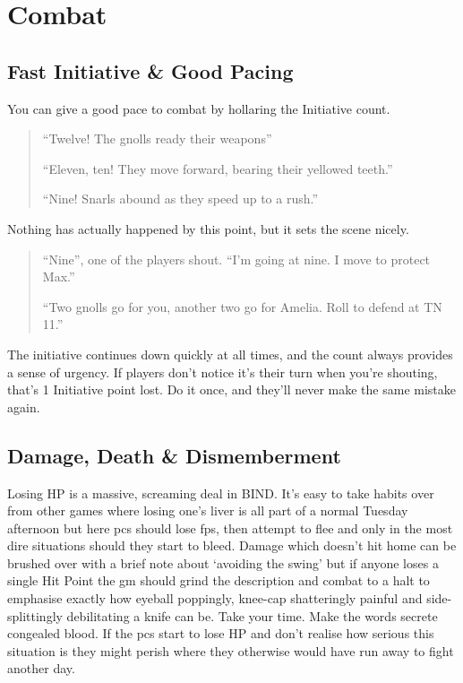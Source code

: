 \section{Combat}

\begin{multicols}{2}

\subsection{Fast Initiative \& Good Pacing}

You can give a good pace to combat by hollaring the Initiative count.

\begin{quote}

``Twelve! The gnolls ready their weapons''

``Eleven, ten! They move forward, bearing their yellowed teeth.''

``Nine! Snarls abound as they speed up to a rush.''

\end{quote}

Nothing has actually happened by this point, but it sets the scene nicely.

\begin{quote}

``Nine'', one of the players shout.  ``I'm going at nine.  I move to protect Max.''

``Two gnolls go for you, another two go for Amelia.  Roll to defend at TN 11.''

\end{quote}

The initiative continues down quickly at all times, and the count always provides a sense of urgency.
If players don't notice it's their turn when you're shouting, that's 1 Initiative point lost.
Do it once, and they'll never make the same mistake again.

\subsection{Damage, Death \& Dismemberment}

Losing HP is a massive, screaming deal in BIND.
It's easy to take habits over from other games where losing one's liver is all part of a normal Tuesday afternoon but here \glspl{pc} should lose \glspl{fp}, then attempt to flee and only in the most dire situations should they start to bleed.
Damage which doesn't hit home can be brushed over with a brief note about `avoiding the swing' but if anyone loses a single Hit Point the \gls{gm} should grind the description and combat to a halt to emphasise exactly how eyeball poppingly, knee-cap shatteringly painful and side-splittingly debilitating a knife can be.
Take your time.
Make the words secrete congealed blood.
If the \glspl{pc} start to lose HP and don't realise how serious this situation is they might perish where they otherwise would have run away to fight another day.


\end{multicols}
